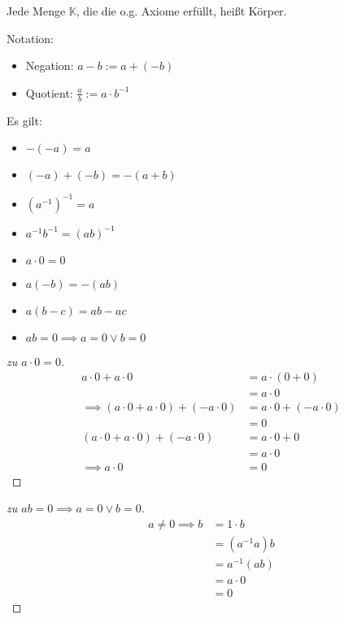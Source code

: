 Jede Menge $\mathbb{K}$, die die o.g. Axiome erfüllt, heißt Körper.

\begin{definition}
  Notation:
  \begin{itemize}
  \item Negation: $a - b := a + (-b)$
  \item Quotient: $\frac{a}{b} := a \cdot b^{-1}$
  \end{itemize}
\end{definition}

\begin{theorem}
  Es gilt:
  \begin{itemize}
  \item $-(-a) = a$
  \item $(-a)+(-b) = -(a+b)$
  \item $(a^{-1})^{-1} = a$
  \item $a^{-1} b^{-1} = (ab)^{-1}$
  \item $a \cdot 0 = 0$
  \item $a(-b) = -(ab)$
  \item $a(b-c) = ab-ac$
  \item $ab = 0 \implies a = 0 \vee b = 0$
  \end{itemize}
\end{theorem}
\begin{proof}[zu $a \cdot 0 = 0$]
  \begin{align*}
    a \cdot 0 + a \cdot 0 &= a \cdot (0+0) \\
    \,&= a \cdot 0 \\
    \implies (a \cdot 0 + a \cdot 0) + (-a \cdot 0) &= a \cdot 0 + (-a \cdot 0) \\
    \,&= 0 \\
    (a \cdot 0 + a \cdot 0) + (-a \cdot 0) &= a \cdot 0 + 0 \\
    \,&= a \cdot 0 \\
    \implies a \cdot 0 &= 0
  \end{align*}
\end{proof}
\begin{proof}[zu $ab = 0 \implies a = 0 \vee b = 0$]
  \begin{align*}
    a \ne 0 \implies b &= 1 \cdot b \\
    \,&= (a^{-1}a)b \\
    \,&= a^{-1}(ab) \\
    \,&= a \cdot 0 \\
    \,&= 0
  \end{align*}
\end{proof}

